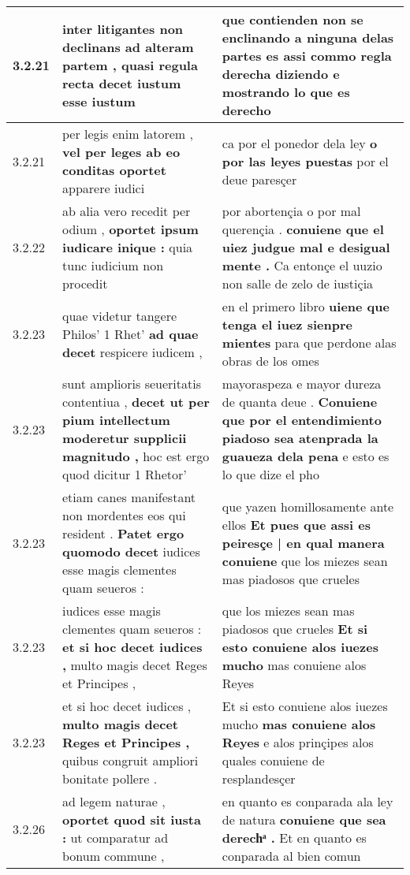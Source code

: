 \begin{tabular}{|p{1cm}|p{6.5cm}|p{6.5cm}|}
3.2.21 & inter litigantes non declinans ad alteram partem , \textbf{ quasi regula recta decet } iustum esse iustum & que contienden non se enclinando a ninguna delas partes es \textbf{ assi commo regla derecha diziendo } e mostrando lo que es derecho \\\hline
3.2.21 & per legis enim latorem , \textbf{ vel per leges ab eo conditas oportet } apparere iudici & ca por el ponedor dela ley \textbf{ o por las leyes puestas } por el deue paresçer \\\hline
3.2.22 & ab alia vero recedit per odium , \textbf{ oportet ipsum iudicare inique : } quia tunc iudicium non procedit & por abortençia o por mal querençia . \textbf{ conuiene que el uiez judgue mal e desigual mente . } Ca entonçe el uuzio non salle de zelo de iustiçia \\\hline
3.2.23 & quae videtur tangere Philos’ 1 Rhet’ \textbf{ ad quae decet } respicere iudicem , & en el primero libro \textbf{ uiene que tenga el iuez sienpre mientes } para que perdone alas obras de los omes \\\hline
3.2.23 & sunt amplioris seueritatis contentiua , \textbf{ decet ut per pium intellectum moderetur supplicii magnitudo , } hoc est ergo quod dicitur 1 Rhetor’ & mayoraspeza e mayor dureza de quanta deue . \textbf{ Conuiene que por el entendimiento piadoso sea atenprada la guaueza dela pena } e esto es lo que dize el pho \\\hline
3.2.23 & etiam canes manifestant non mordentes eos qui resident . \textbf{ Patet ergo quomodo decet } iudices esse magis clementes quam seueros : & que yazen homillosamente ante ellos \textbf{ Et pues que assi es peiresçe | en qual manera conuiene } que los miezes sean mas piadosos que crueles \\\hline
3.2.23 & iudices esse magis clementes quam seueros : \textbf{ et si hoc decet iudices , } multo magis decet Reges et Principes , & que los miezes sean mas piadosos que crueles \textbf{ Et si esto conuiene alos iuezes mucho } mas conuiene alos Reyes \\\hline
3.2.23 & et si hoc decet iudices , \textbf{ multo magis decet Reges et Principes , } quibus congruit ampliori bonitate pollere . & Et si esto conuiene alos iuezes mucho \textbf{ mas conuiene alos Reyes } e alos prinçipes alos quales conuiene de resplandesçer \\\hline
3.2.26 & ad legem naturae , \textbf{ oportet quod sit iusta : } ut comparatur ad bonum commune , & en quanto es conparada ala ley de natura \textbf{ conuiene que sea derechͣ . } Et en quanto es conparada al bien comun \\\hline

\end{tabular}
